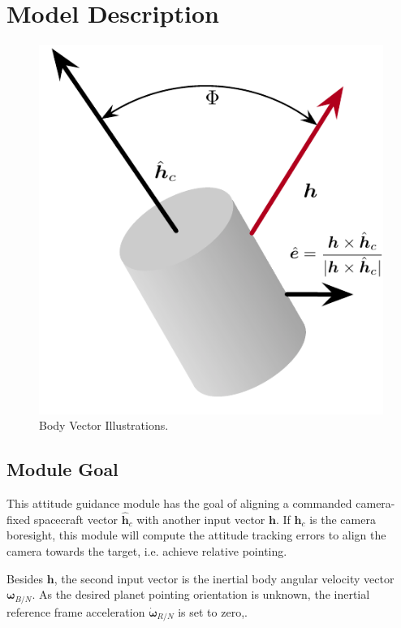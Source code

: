 
\section{Model Description}

\begin{figure}[t]
	\centerline{
		\includegraphics{Figures/Heading}
	}
	\caption{Body Vector Illustrations.}
	\label{fig:Fig1}
\end{figure}

\subsection{Module Goal}
This attitude guidance module has the goal of aligning a commanded camera-fixed spacecraft vector $\hat{\bm h}_{c}$ with another input vector $\bm h$.  If $\hat{\bm h}_{c}$ is the camera boresight, this module will compute the attitude tracking errors to align the camera towards the target, i.e. achieve relative pointing. 

Besides $\bm h$, the second input vector is the inertial body angular velocity vector $\bm\omega_{B/N}$. As the desired planet pointing orientation is unknown, the inertial reference frame acceleration $\dot{\bm\omega}_{R/N}$ is set to zero,.  

